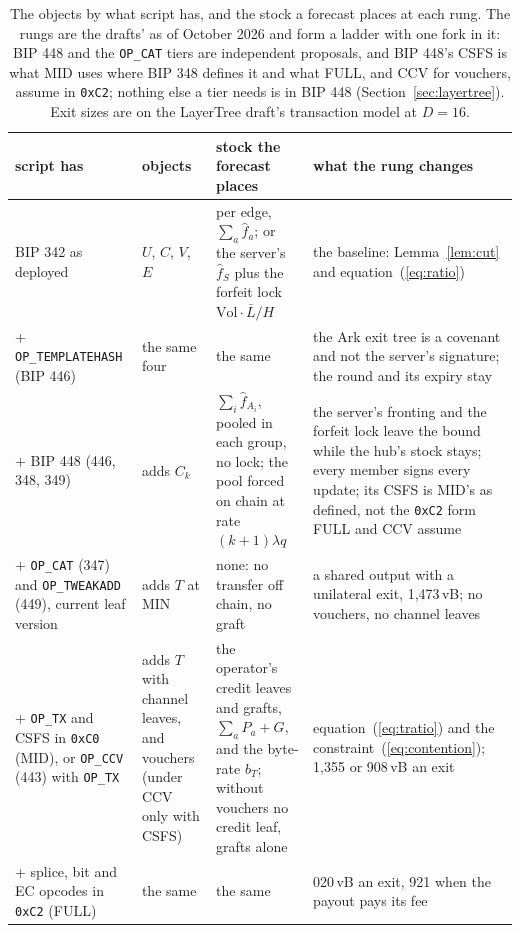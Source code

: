 \documentclass[11pt]{article}
\theoremstyle{plain}
\theoremstyle{definition}
\theoremstyle{remark}
\begin{document}
\begin{table}[t]
\centering
\footnotesize
\setlength{\tabcolsep}{4pt}
\begin{tabular}{@{}>{\raggedright\arraybackslash}p{3.0cm}>{\raggedright\arraybackslash}p{2.2cm}>{\raggedright\arraybackslash}p{4.0cm}>{\raggedright\arraybackslash}p{4.4cm}@{}}
\toprule
script has & objects & stock the forecast places & what the rung changes \\
\midrule
BIP 342 as deployed & $U$, $C$, $V$, $E$ & per edge, $\sum_a\hat f_a$; or the server's $\hat f_S$ plus the forfeit lock $\mathrm{Vol}\cdot\bar L/H$ & the baseline: Lemma~\ref{lem:cut} and equation~(\ref{eq:ratio}) \\
+ \texttt{OP\_TEMPLATEHASH} (BIP 446) & the same four & the same & the Ark exit tree is a covenant and not the server's signature; the round and its expiry stay \\
+ BIP 448 (446, 348, 349) & adds $C_k$ & $\sum_i\hat f_{A_i}$, pooled in each group, no lock; the pool forced on chain at rate $(k+1)\lambda q$ & the server's fronting and the forfeit lock leave the bound while the hub's stock stays; every member signs every update; its CSFS is MID's as defined, not the \texttt{0xC2} form FULL and CCV assume \\
+ \texttt{OP\_CAT} (347) and \texttt{OP\_TWEAKADD} (449), current leaf version & adds $T$ at MIN & none: no transfer off chain, no graft & a shared output with a unilateral exit, 1{,}473\,vB; no vouchers, no channel leaves \\
+ \texttt{OP\_TX} and CSFS in \texttt{0xC0} (MID), or \texttt{OP\_CCV} (443) with \texttt{OP\_TX} & adds $T$ with channel leaves, and vouchers (under CCV only with CSFS) & the operator's credit leaves and grafts, $\sum_a P_a+G$, and the byte-rate $b_T$; without vouchers no credit leaf, grafts alone & equation~(\ref{eq:tratio}) and the constraint~(\ref{eq:contention}); 1{,}355 or 908\,vB an exit \\
+ splice, bit and EC opcodes in \texttt{0xC2} (FULL) & the same & the same & 1{,}020\,vB an exit, 921 when the payout pays its fee \\
\bottomrule
\end{tabular}
\caption{The objects by what script has, and the stock a forecast places at each rung. The rungs are the drafts' as of October 2026 and form a ladder with one fork in it: BIP 448 and the \texttt{OP\_CAT} tiers are independent proposals, and BIP 448's CSFS is what MID uses where BIP 348 defines it and what FULL, and CCV for vouchers, assume in \texttt{0xC2}; nothing else a tier needs is in BIP 448 (Section~\ref{sec:layertree}). Exit sizes are on the LayerTree draft's transaction model at $D=16$.}
\label{tab:ladder}
\end{table}
\end{document}
